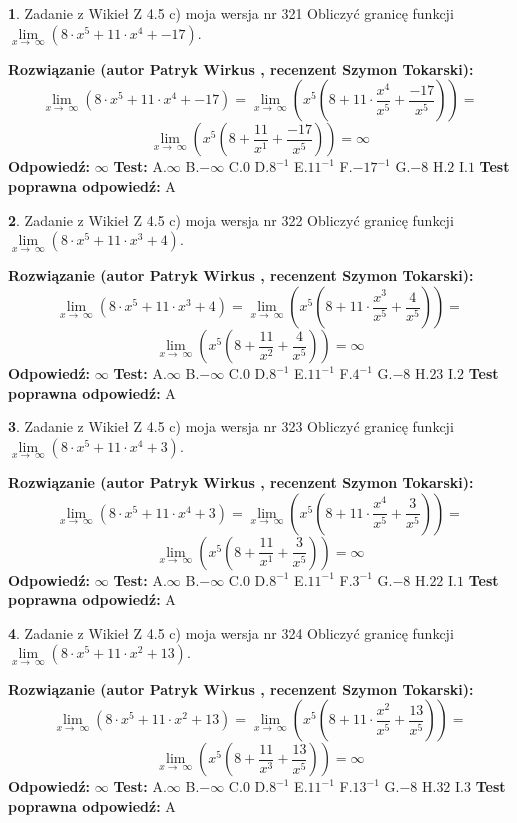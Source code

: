 \documentclass[12pt, a4paper]{article}
\theoremstyle{definition} %
\newtheorem{zad}{}
\newcommand{\zadStart}[1]{\begin{zad}#1\newline}
\newcommand{\zadStop}{\end{zad}}
\newcommand{\rozwStart}[2]{\noindent \textbf{Rozwiązanie (autor #1 , recenzent #2): }\newline}
\newcommand{\rozwStop}{\newline}
\newcommand{\odpStart}{\noindent \textbf{Odpowiedź:}\newline}
\newcommand{\odpStop}{\newline}
\newcommand{\testStart}{\noindent \textbf{Test:}\newline}
\newcommand{\testStop}{\newline}
\newcommand{\kluczStart}{\noindent \textbf{Test poprawna odpowiedź:}\newline}
\newcommand{\kluczStop}{\newline}
\begin{document}
\zadStart{Zadanie z Wikieł Z 4.5 c) moja wersja nr 321}
Obliczyć granicę funkcji  $\lim\limits_{x\to\ \infty}(8 \cdot x^{5}+11 \cdot x^{4}+-17)$.
\zadStop
\rozwStart{Patryk Wirkus}{Szymon Tokarski}
$$\lim\limits_{x\to\ \infty}(8 \cdot x^{5}+11 \cdot x^{4}+-17) = \lim\limits_{x\to\ \infty}(x^{5}(8 +11 \cdot \frac{x^{4}}{x^{5}}+\frac{-17}{x^{5}})) =$$ $$\lim\limits_{x\to\ \infty}(x^{5}(8 +\frac{11}{x^{1}}+\frac{-17}{x^{5}})) =\infty$$
\rozwStop
\odpStart
$\infty$
\odpStop
\testStart
A.$\infty$ B.$-\infty$ C.$0$ D.$8^{-1}$ E.$11^{-1}$
F.$-17^{-1}$ G.$-8$
H.$2$
I.$1$
\testStop
\kluczStart
A
\kluczStop



\zadStart{Zadanie z Wikieł Z 4.5 c) moja wersja nr 322}
Obliczyć granicę funkcji  $\lim\limits_{x\to\ \infty}(8 \cdot x^{5}+11 \cdot x^{3}+4)$.
\zadStop
\rozwStart{Patryk Wirkus}{Szymon Tokarski}
$$\lim\limits_{x\to\ \infty}(8 \cdot x^{5}+11 \cdot x^{3}+4) = \lim\limits_{x\to\ \infty}(x^{5}(8 +11 \cdot \frac{x^{3}}{x^{5}}+\frac{4}{x^{5}})) =$$ $$\lim\limits_{x\to\ \infty}(x^{5}(8 +\frac{11}{x^{2}}+\frac{4}{x^{5}})) =\infty$$
\rozwStop
\odpStart
$\infty$
\odpStop
\testStart
A.$\infty$ B.$-\infty$ C.$0$ D.$8^{-1}$ E.$11^{-1}$
F.$4^{-1}$ G.$-8$
H.$23$
I.$2$
\testStop
\kluczStart
A
\kluczStop



\zadStart{Zadanie z Wikieł Z 4.5 c) moja wersja nr 323}
Obliczyć granicę funkcji  $\lim\limits_{x\to\ \infty}(8 \cdot x^{5}+11 \cdot x^{4}+3)$.
\zadStop
\rozwStart{Patryk Wirkus}{Szymon Tokarski}
$$\lim\limits_{x\to\ \infty}(8 \cdot x^{5}+11 \cdot x^{4}+3) = \lim\limits_{x\to\ \infty}(x^{5}(8 +11 \cdot \frac{x^{4}}{x^{5}}+\frac{3}{x^{5}})) =$$ $$\lim\limits_{x\to\ \infty}(x^{5}(8 +\frac{11}{x^{1}}+\frac{3}{x^{5}})) =\infty$$
\rozwStop
\odpStart
$\infty$
\odpStop
\testStart
A.$\infty$ B.$-\infty$ C.$0$ D.$8^{-1}$ E.$11^{-1}$
F.$3^{-1}$ G.$-8$
H.$22$
I.$1$
\testStop
\kluczStart
A
\kluczStop



\zadStart{Zadanie z Wikieł Z 4.5 c) moja wersja nr 324}
Obliczyć granicę funkcji  $\lim\limits_{x\to\ \infty}(8 \cdot x^{5}+11 \cdot x^{2}+13)$.
\zadStop
\rozwStart{Patryk Wirkus}{Szymon Tokarski}
$$\lim\limits_{x\to\ \infty}(8 \cdot x^{5}+11 \cdot x^{2}+13) = \lim\limits_{x\to\ \infty}(x^{5}(8 +11 \cdot \frac{x^{2}}{x^{5}}+\frac{13}{x^{5}})) =$$ $$\lim\limits_{x\to\ \infty}(x^{5}(8 +\frac{11}{x^{3}}+\frac{13}{x^{5}})) =\infty$$
\rozwStop
\odpStart
$\infty$
\odpStop
\testStart
A.$\infty$ B.$-\infty$ C.$0$ D.$8^{-1}$ E.$11^{-1}$
F.$13^{-1}$ G.$-8$
H.$32$
I.$3$
\testStop
\kluczStart
A
\kluczStop
\end{document}
